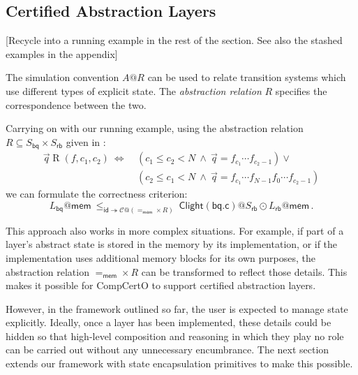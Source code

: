 \documentclass[acmsmall,screen,review,anonymous]{acmart}
\newcommand{\kw}[1]{\ensuremath{ \mathsf{#1} }}
\newcommand{\Clight}{\ensuremath{ \mathsf{Clight} }}
\begin{document}

\subsection{Certified Abstraction Layers} \label{sec:base:abrel} %

[Recycle into a running example in the rest of the section.
See also the stashed examples in the appendix]

The simulation convention $A@R$
can be used to relate transition systems which use
different types of explicit state.
The \emph{abstraction relation} $R$
specifies the correspondence between the two.

\begin{example}[Correctness of \kw{bq.c}] \label{ex:bqcorrect}
Carrying on with our running example,
using the abstraction relation $R \subseteq S_\kw{bq} \times S_\kw{rb}$
given in \citet{rbgs-cal}:
\begin{align*}
  \vec{q} \mathrel{R} (f, c_1, c_2) \:\Leftrightarrow\: {}
    & (c_1 \le c_2 < N \:\wedge\: \vec{q} = f_{c_1} \cdots f_{c_2-1}) \vee {} \\
    & (c_2 \le c_1 < N \:\wedge\: \vec{q} = f_{c_1} \cdots f_{N-1} f_0 \cdots f_{c_2 - 1})
\end{align*}
we can formulate the correctness criterion:
\[
  L_\kw{bq}@\kw{mem}
  \:\le_{\kw{id} \twoheadrightarrow \mathcal{C}@({=}_\kw{mem} \times R)}\:
  \Clight(\kw{bq.c})@S_\kw{rb} \odot
  L_\kw{rb}@\kw{mem}
  \,.
\]
\end{example}

This approach also works in more complex situations.
For example,
if part of a layer's abstract state is
stored in the memory by its implementation,
or if the implementation uses additional memory blocks
for its own purposes,
the abstraction relation ${=}_\kw{mem} \times R$
can be transformed to reflect those details.
This makes it possible for CompCertO
to support certified abstraction layers.

However,
in the framework outlined so far,
the user is expected to manage state explicitly.
Ideally,
once a layer has been implemented,
these details could be hidden so that
high-level composition and reasoning
in which they play no role
can be carried out without any unnecessary
encumbrance.
The next section
extends our framework
with state encapsulation primitives
to make this possible.

\end{document}
